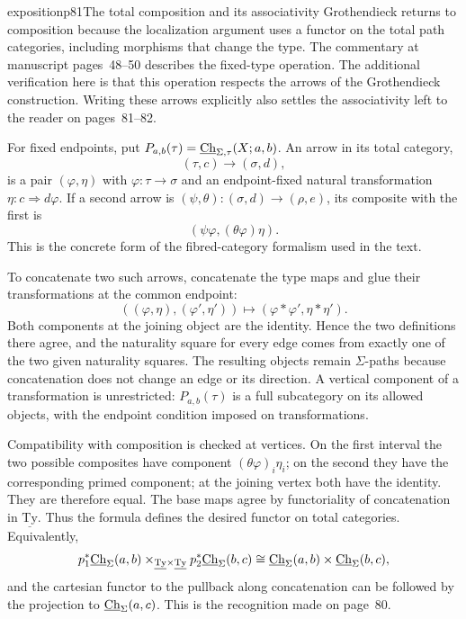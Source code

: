 \begin{dcomment}{exposition}{p81}{The total composition and its associativity}
Grothendieck returns to composition because the localization argument uses a functor on the total path categories, including morphisms that change the type. The commentary at manuscript pages~48--50 describes the fixed-type operation. The additional verification here is that this operation respects the arrows of the Grothendieck construction. Writing these arrows explicitly also settles the associativity left to the reader on pages~81--82.

For fixed endpoints, put $P_{a,b}(\tau)=\underline{\mathrm{Ch}}_{\Sigma,\tau}(X;a,b)$. An arrow in its total category,
\[
 (\tau,c)\longrightarrow(\sigma,d),
\]
is a pair $(\varphi,\eta)$ with $\varphi:\tau\to\sigma$ and an endpoint-fixed natural transformation $\eta:c\Rightarrow d\varphi$. If a second arrow is $(\psi,\theta):(\sigma,d)\to(\rho,e)$, its composite with the first is
\[
 (\psi\varphi,(\theta\varphi)\eta).
\]
This is the concrete form of the fibred-category formalism used in the text.

To concatenate two such arrows, concatenate the type maps and glue their transformations at the common endpoint:
\[
 ((\varphi,\eta),(\varphi',\eta'))
       \longmapsto(\varphi*\varphi',\eta*\eta').
\]
Both components at the joining object are the identity. Hence the two definitions there agree, and the naturality square for every edge comes from exactly one of the two given naturality squares. The resulting objects remain $\Sigma$-paths because concatenation does not change an edge or its direction. A vertical component of a transformation is unrestricted: $P_{a,b}(\tau)$ is a full subcategory on its allowed objects, with the endpoint condition imposed on transformations.

Compatibility with composition is checked at vertices. On the first interval the two possible composites have component $(\theta\varphi)_i\eta_i$; on the second they have the corresponding primed component; at the joining vertex both have the identity. They are therefore equal. The base maps agree by functoriality of concatenation in $\underline{\mathrm{Ty}}$. Thus the formula defines the desired functor on total categories. Equivalently,
\[
 p_1^*\underline{\mathrm{Ch}}_\Sigma(a,b)\times_{\underline{\mathrm{Ty}}\times\underline{\mathrm{Ty}}}
 p_2^*\underline{\mathrm{Ch}}_\Sigma(b,c)
 \cong \underline{\mathrm{Ch}}_\Sigma(a,b)\times\underline{\mathrm{Ch}}_\Sigma(b,c),
\]
and the cartesian functor to the pullback along concatenation can be followed by the projection to $\underline{\mathrm{Ch}}_\Sigma(a,c)$. This is the recognition made on page~80.


\end{dcomment}
